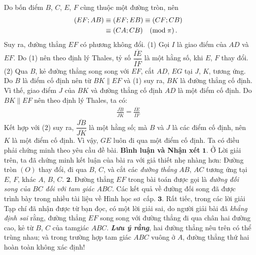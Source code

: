 \begin{multicols}{2}
\begin{figure}[H]
\begin{tikzpicture}[scale=0.45,thachthuctoanhoc]
		\end{tikzpicture}
		\vspace*{-10pt}
	\end{figure}
	Do bốn điểm $B$, $C$, $E$, $F$ cùng thuộc một đường tròn, nên
	\begin{align*}
		\left( {EF;AB} \right) &\equiv \left( {EF;EB} \right) \equiv \left( {CF;CB} \right) \\
		&\equiv \left( {CA;CB} \right)\;\;\;\left( {{\rm{mod}}\;\pi } \right).
	\end{align*}
	Suy ra, đường thẳng $EF$ có phương không đổi.                    \hfill ($1$)
	\vskip 0.05cm
	Gọi $I$ là giao điểm của $AD$ và $EF$. Do ($1$) nên theo định lý Thales, tỷ số $\dfrac{{\overline {IE} }}{{\overline {IF} }}$ là một hằng số, khi $E$, $F$ thay đổi.                                                               \hfill ($2$)
	\vskip 0.05cm
	Qua $B$, kẻ đường thẳng song song với $EF$, cắt $AD$, $EG$ tại $J$, $K$, tương ứng.
	\vskip 0.05cm
	Do $B$ là điểm cố định nên từ $BK \parallel EF$ và ($1$) suy ra, $BK$ là đường thẳng cố định. Vì thế, giao điểm $J$ của $BK$ và đường thẳng cố định $AD$ là một điểm cố định.
	\vskip 0.05cm
	Do $BK \parallel EF$ nên theo định lý Thales, ta có:
	\begin{align*}
		\frac{{\overline {JB} }}{{\overline {JK} }} = \frac{{\overline {IE} }}{{\overline {IF} }}
	\end{align*}
	Kết hợp với ($2$) suy ra, $\dfrac{{\overline {JB} }}{{\overline {JK} }}$ là một hằng số; mà $B$ và $J$ là các điểm cố định, nên $K$ là một điểm cố định.
	\vskip 0.05cm
	Vì vậy, $GE$ luôn đi qua một điểm cố định. Ta có điều phải chứng minh theo yêu cầu đề bài.
	\vskip 0.05cm
	\textbf{\color{thachthuctoanhoc}Bình luận và Nhận xét}
	\vskip 0.05cm
	$\pmb{1.}$ Ở Lời giải trên, ta đã chứng minh kết luận của bài ra với giả thiết nhẹ nhàng hơn: Đường tròn $(O)$ thay đổi, đi qua $B$, $C$, và cắt các \textit{đường thẳng} $AB$, $AC$ tương ứng tại $E$, $F$, khác $A$, $B$, $C$.
	\vskip 0.05cm
	$\pmb{2.}$ Đường thẳng $EF$ trong bài toán được gọi là \textit{đường đối song của $BC$ đối với tam giác $ABC$}. Các kết quả về đường đối song đã được trình bày trong nhiều tài liệu về Hình học sơ~cấp.
	\vskip 0.05cm
	$\pmb{3.}$ Rất tiếc, trong các lời giải Tạp chí đã nhận được từ bạn đọc, có một lời giải sai, do người giải bài đã \textit{khẳng định sai} rằng, đường thẳng $EF$ song song với đường thẳng đi qua chân hai đường cao, kẻ từ $B$, $C$ của tam\linebreak giác $ABC$.
	\vskip 0.05cm
	\textbf{\color{thachthuctoanhoc}\textit{Lưu ý rằng}}, hai đường thẳng nêu trên có thể trùng nhau; và trong trường hợp tam giác $ABC$ vuông ở $A$, đường thẳng thứ hai hoàn toàn không xác định!

\end{multicols}
